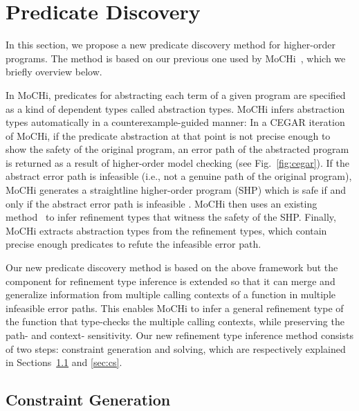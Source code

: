 

\section{Predicate Discovery}
\label{sec:refine}

In this section, we propose a new predicate discovery method for
higher-order programs.  The method is based on our previous one used by
MoCHi~\cite{KobayashiPLDI2011}, which we briefly overview below.

In MoCHi, predicates for abstracting each term of a given program are
specified as a kind of dependent types called abstraction types.  MoCHi
infers abstraction types automatically in a counterexample-guided manner:
 In a CEGAR iteration of MoCHi, if the predicate abstraction at that
point is not precise enough to show the safety of the original program,
an error path of the abstracted program is returned as a result of
higher-order model checking (see Fig.~\ref{fig:cegar}).  If the abstract
error path is infeasible (i.e., not a genuine path of the original
program), MoCHi generates a straightline higher-order program (SHP)
which is safe if and only if the abstract error path is infeasible .
MoCHi then uses an existing method~\cite{Unno2009} to infer refinement
types that witness the safety of the SHP.  Finally, MoCHi extracts
abstraction types from the refinement types, which contain precise
enough predicates to refute the infeasible error path.

Our new predicate discovery method is based on the above framework but
the component for refinement type inference is extended so that it can
merge and generalize information from multiple calling contexts of a
function in multiple infeasible error paths.  This enables MoCHi to
infer a general refinement type of the function that type-checks the
multiple calling contexts, while preserving the path- and context-
sensitivity.  Our new refinement type inference method consists of two
steps: constraint generation and solving, which are respectively
explained in Sections~\ref{sec:cg} and \ref{sec:cs}.

\subsection{Constraint Generation}
\label{sec:cg}

